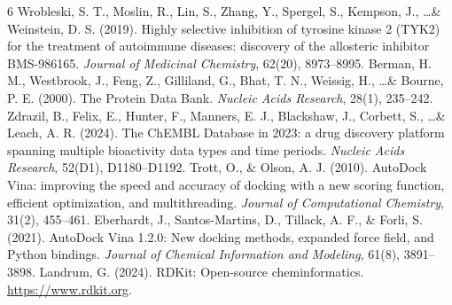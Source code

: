 \documentclass[10pt,letterpaper]{article}
\begin{document}
\begin{thebibliography}{6}
\small
{} Wrobleski, S. T., Moslin, R., Lin, S., Zhang, Y., Spergel, S., Kempson, J., \dots \& Weinstein, D. S. (2019). Highly selective inhibition of tyrosine kinase 2 (TYK2) for the treatment of autoimmune diseases: discovery of the allosteric inhibitor BMS-986165. \textit{Journal of Medicinal Chemistry}, 62(20), 8973--8995.
 Berman, H. M., Westbrook, J., Feng, Z., Gilliland, G., Bhat, T. N., Weissig, H., \dots \& Bourne, P. E. (2000). The Protein Data Bank. \textit{Nucleic Acids Research}, 28(1), 235--242.
 Zdrazil, B., Felix, E., Hunter, F., Manners, E. J., Blackshaw, J., Corbett, S., \dots \& Leach, A. R. (2024). The ChEMBL Database in 2023: a drug discovery platform spanning multiple bioactivity data types and time periods. \textit{Nucleic Acids Research}, 52(D1), D1180--D1192.
 Trott, O., \& Olson, A. J. (2010). AutoDock Vina: improving the speed and accuracy of docking with a new scoring function, efficient optimization, and multithreading. \textit{Journal of Computational Chemistry}, 31(2), 455--461.
 Eberhardt, J., Santos-Martins, D., Tillack, A. F., \& Forli, S. (2021). AutoDock Vina 1.2.0: New docking methods, expanded force field, and Python bindings. \textit{Journal of Chemical Information and Modeling}, 61(8), 3891--3898.
 Landrum, G. (2024). RDKit: Open-source cheminformatics. \url{https://www.rdkit.org}.
\end{thebibliography}
\end{document}
